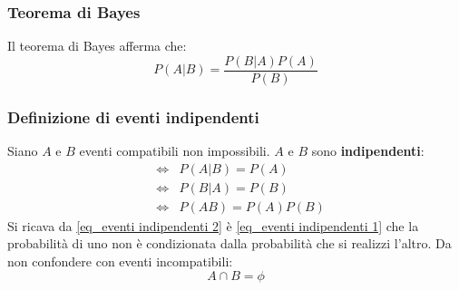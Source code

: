 \documentclass[11pt,a4paper]{book}
\begin{document}
\subsubsection{Teorema di Bayes} 
Il teorema di Bayes afferma che:
\begin{equation}
P(A|B) = \frac{P(B|A)P(A)}{P(B)}
\end{equation}
\subsubsection{Definizione di eventi indipendenti} 
Siano $ A $ e $ B $ eventi compatibili non impossibili.
$ A $ e $ B $  sono \textbf{indipendenti}:
\begin{eqnarray}
& \Longleftrightarrow & P(A|B) = P(A) \label{eq_eventi indipendenti 1}\\
&\Longleftrightarrow & P(B|A) = P(B) \label{eq_eventi indipendenti 2}\\
&\Longleftrightarrow & P(AB) = P(A)P(B)
\end{eqnarray}
Si ricava da \eqref{eq_eventi indipendenti 2} è \eqref{eq_eventi indipendenti 1} che la probabilità di uno non è condizionata dalla probabilità che si realizzi l'altro.
Da non confondere con eventi incompatibili:
\begin{equation}
A \cap B  = \phi
\end{equation}
\end{document}
